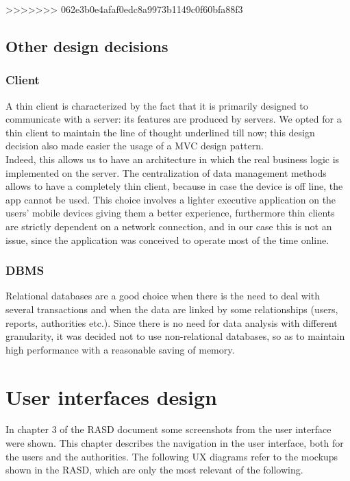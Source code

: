 \documentclass[12pt,a4paper]{report}
\begin{document}
>>>>>>> 062e3b0e4afaf0edc8a9973b1149c0f60bfa88f3
		\section{Other design decisions}
			\subsection{Client}
				A thin client is characterized by the fact that it is primarily designed to communicate with a server: its features 
				are produced by servers. We opted for a thin client to maintain the line of thought underlined till now; this
				design decision also made easier the usage of a MVC design pattern.\\
				Indeed, this allows us to have an architecture in which the real business logic is implemented on the server.
				The centralization of data management methods allows to have a completely thin client, because in case the
				device is off line, the app cannot be used. This choice involves a lighter executive application on the users'
				mobile devices giving them a better experience, furthermore thin clients are strictly dependent on a network 
				connection, and in our case this is not an issue, since the application was conceived to operate most 
				of the time online.\\
			\subsection{DBMS}
				Relational databases are a good choice when there is the need to deal with several transactions and 
				when the data are linked by some relationships (users, reports, authorities etc.). Since there is no need for
				data analysis with different granularity, it was decided not to use non-relational databases, so as to maintain
				high performance with a reasonable saving of memory.

	\chapter{User interfaces design}
	In chapter 3 of the RASD document some screenshots from the user interface were shown. This chapter describes the navigation in the user interface, both for the users and the authorities. The following UX diagrams refer to the mockups shown in the RASD, which are only the most relevant of the following.
\end{document}
